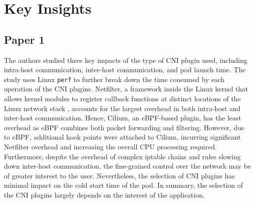 \section{Key Insights}%
\label{sec:Key Insights}
\subsection{Paper 1}%
\label{sub:Paper 1}
The authors \cite{C1} studied three key impacts of the type of CNI plugin used, including intra-host communication, inter-host communication, and pod launch time.  
The study uses Linux \texttt{perf} to further break down the time consumed by each operation of the CNI plugins.  
Netfilter, a framework inside the Linux kernel that allows kernel modules to register callback functions at distinct locations of the Linux network stack \cite{netfilter2025}, accounts for the largest overhead in both intra-host and inter-host communication.  
Hence, Cilium, an eBPF-based plugin, has the least overhead as eBPF combines both packet forwarding and filtering.  
However, due to eBPF, additional hook points were attached to Cilium, incurring significant Netfilter overhead and increasing the overall CPU processing required.  
Furthermore, despite the overhead of complex iptable chains and rules slowing down inter-host communication, the fine-grained control over the network may be of greater interest to the user.  
Nevertheless, the selection of CNI plugins has minimal impact on the cold start time of the pod.  
In summary, the selection of the CNI plugins largely depends on the interest of the application.









